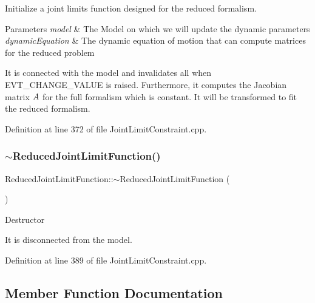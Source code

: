 Initialize a joint limits function designed for the reduced formalism.


\begin{DoxyParams}{Parameters}
{\em model} & The Model on which we will update the dynamic parameters \\
\hline
{\em dynamic\+Equation} & The dynamic equation of motion that can compute matrices for the reduced problem\\
\hline
\end{DoxyParams}
It is connected with the model and invalidates all when E\+V\+T\+\_\+\+C\+H\+A\+N\+G\+E\+\_\+\+V\+A\+L\+UE is raised. Furthermore, it computes the Jacobian matrix $ A $ for the full formalism which is constant. It will be transformed to fit the reduced formalism. 

Definition at line 372 of file Joint\+Limit\+Constraint.\+cpp.

\hypertarget{classocra_1_1ReducedJointLimitFunction_a96e9196a18c5eb5e92672b45a7491c65}{}\label{classocra_1_1ReducedJointLimitFunction_a96e9196a18c5eb5e92672b45a7491c65} 
\subsubsection{\texorpdfstring{$\sim$\+Reduced\+Joint\+Limit\+Function()}{~ReducedJointLimitFunction()}}
{\footnotesize\ttfamily Reduced\+Joint\+Limit\+Function\+::$\sim$\+Reduced\+Joint\+Limit\+Function (\begin{DoxyParamCaption}{ }\end{DoxyParamCaption})}

Destructor

It is disconnected from the model. 

Definition at line 389 of file Joint\+Limit\+Constraint.\+cpp.



\subsection{Member Function Documentation}
\hypertarget{classocra_1_1ReducedJointLimitFunction_aaf30e3ac7c3053707a04a147b545126c}{}\label{classocra_1_1ReducedJointLimitFunction_aaf30e3ac7c3053707a04a147b545126c} 
